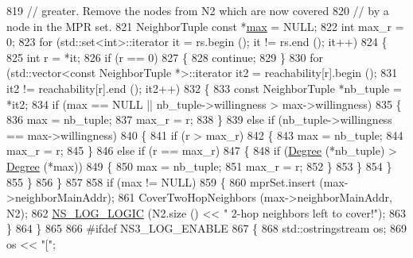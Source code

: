 \begin{DoxyCode}
819       \textcolor{comment}{// greater. Remove the nodes from N2 which are now covered}
820       \textcolor{comment}{// by a node in the MPR set.}
821       NeighborTuple \textcolor{keyword}{const} *\hyperlink{80211b_8c_affe776513b24d84b39af8ab0930fef7f}{max} = NULL;
822       \textcolor{keywordtype}{int} max\_r = 0;
823       \textcolor{keywordflow}{for} (std::set<int>::iterator it = rs.begin (); it != rs.end (); it++)
824         \{
825           \textcolor{keywordtype}{int} r = *it;
826           \textcolor{keywordflow}{if} (r == 0)
827             \{
828               \textcolor{keywordflow}{continue};
829             \}
830           \textcolor{keywordflow}{for} (std::vector<const NeighborTuple *>::iterator it2 = reachability[r].begin ();
831                it2 != reachability[r].end (); it2++)
832             \{
833               \textcolor{keyword}{const} NeighborTuple *nb\_tuple = *it2;
834               \textcolor{keywordflow}{if} (max == NULL || nb\_tuple->willingness > max->willingness)
835                 \{
836                   max = nb\_tuple;
837                   max\_r = r;
838                 \}
839               \textcolor{keywordflow}{else} \textcolor{keywordflow}{if} (nb\_tuple->willingness == max->willingness)
840                 \{
841                   \textcolor{keywordflow}{if} (r > max\_r)
842                     \{
843                       max = nb\_tuple;
844                       max\_r = r;
845                     \}
846                   \textcolor{keywordflow}{else} \textcolor{keywordflow}{if} (r == max\_r)
847                     \{
848                       \textcolor{keywordflow}{if} (\hyperlink{classns3_1_1olsr_1_1RoutingProtocol_af4806875b065d6fe5704ce65824dc1a7}{Degree} (*nb\_tuple) > \hyperlink{classns3_1_1olsr_1_1RoutingProtocol_af4806875b065d6fe5704ce65824dc1a7}{Degree} (*max))
849                         \{
850                           max = nb\_tuple;
851                           max\_r = r;
852                         \}
853                     \}
854                 \}
855             \}
856         \}
857 
858       \textcolor{keywordflow}{if} (max != NULL)
859         \{
860           mprSet.insert (max->neighborMainAddr);
861           CoverTwoHopNeighbors (max->neighborMainAddr, N2);
862           \hyperlink{group__logging_ga88acd260151caf2db9c0fc84997f45ce}{NS\_LOG\_LOGIC} (N2.size () << \textcolor{stringliteral}{" 2-hop neighbors left to cover!"});
863         \}
864     \}
865 
866 \textcolor{preprocessor}{#ifdef NS3\_LOG\_ENABLE}
867   \{
868     std::ostringstream os;
869     os << \textcolor{stringliteral}{"["};

\end{DoxyCode}

